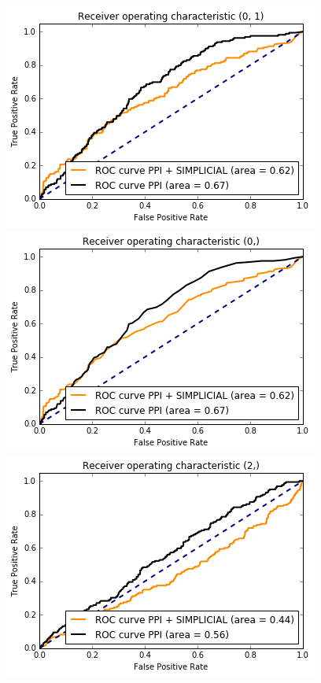 \documentclass[9pt]{article}
\begin{document}
{\newpage
\begin{figure}[!htb]
  \includegraphics[width=\linewidth]{logisticRegressionGraphs/logr1S.png}
\endminipage\hfill
{}
  \includegraphics[width=\linewidth]{logisticRegressionGraphs/logr2S.png}
\endminipage\hfill
{}%
  \includegraphics[width=\linewidth]{logisticRegressionGraphs/logr3S.png}

\end{figure}}
\end{document}
